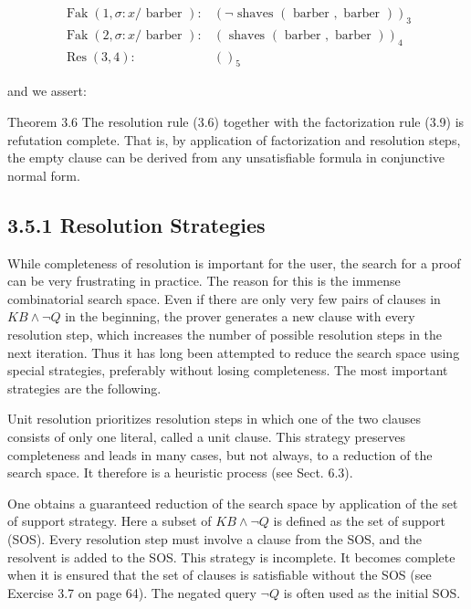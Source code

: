 \documentclass[10pt]{book}
\begin{document}
$$
\begin{aligned}
\operatorname{Fak}(1, \sigma: x / \text { barber }): & (\neg \text { shaves }(\text { barber }, \text { barber }))_{3} \\
\operatorname{Fak}(2, \sigma: x / \text { barber }): & (\text { shaves }(\text { barber }, \text { barber }))_{4} \\
\operatorname{Res}(3,4): & ()_{5}
\end{aligned}
$$

and we assert:

Theorem 3.6 The resolution rule (3.6) together with the factorization rule (3.9) is refutation complete. That is, by application of factorization and resolution steps, the empty clause can be derived from any unsatisfiable formula in conjunctive normal form.

\subsection*{3.5.1 Resolution Strategies}
While completeness of resolution is important for the user, the search for a proof can be very frustrating in practice. The reason for this is the immense combinatorial search space. Even if there are only very few pairs of clauses in $K B \wedge \neg Q$ in the beginning, the prover generates a new clause with every resolution step, which increases the number of possible resolution steps in the next iteration. Thus it has long been attempted to reduce the search space using special strategies, preferably without losing completeness. The most important strategies are the following.


Unit resolution prioritizes resolution steps in which one of the two clauses consists of only one literal, called a unit clause. This strategy preserves completeness and leads in many cases, but not always, to a reduction of the search space. It therefore is a heuristic process (see Sect. 6.3).

One obtains a guaranteed reduction of the search space by application of the set of support strategy. Here a subset of $K B \wedge \neg Q$ is defined as the set of support (SOS). Every resolution step must involve a clause from the SOS, and the resolvent is added to the SOS. This strategy is incomplete. It becomes complete when it is ensured that the set of clauses is satisfiable without the SOS (see Exercise 3.7 on page 64). The negated query $\neg Q$ is often used as the initial SOS.
\end{document}
